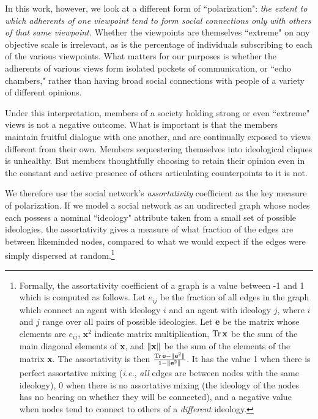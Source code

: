 In this work, however, we look at a different form of ``polarization":
\textit{the extent to which adherents of one viewpoint tend to form social
connections only with others of that same viewpoint.} Whether the viewpoints
are themselves ``extreme" on any objective scale is irrelevant, as is the
percentage of individuals subscribing to each of the various viewpoints. What
matters for our purposes is whether the adherents of various views form
isolated pockets of communication, or ``echo chambers," rather than having
broad social connections with people of a variety of different opinions.

Under this interpretation, members of a society holding strong or even
``extreme" views is not a negative outcome. What is important is that the
members maintain fruitful dialogue with one another, and are continually
exposed to views different from their own. Members sequestering themselves
into ideological cliques is unhealthy. But members thoughtfully choosing
to retain their opinion even in the constant and active presence of others
articulating counterpoints to it is not.

We therefore use the social network's \textit{assortativity}
coefficient\cite{newman_mixing_2003} as the key measure of polarization. If we
model a social network as an undirected graph whose nodes each possess a
nominal ``ideology" attribute taken from a small set of possible ideologies,
the assortativity gives a measure of what fraction of the edges are between
likeminded nodes, compared to what we would expect if the edges were simply
dispersed at random.\footnote{Formally, the assortativity coefficient of a
graph is a value between -1 and 1 which is computed as follows. Let $e_{ij}$
be the fraction of all edges in the graph which connect an agent with ideology
$i$ and an agent with ideology $j$, where $i$ and $j$ range over all pairs of
possible ideologies. Let \textbf{e} be the matrix whose elements are $e_{ij}$,
$\textbf{x}^2$ indicate matrix multiplication, $\operatorname{Tr} \textbf{x}$ be the sum of
the main diagonal elements of \textbf{x}, and $\lVert\textbf{x}\rVert$ be the sum
of the elements of the matrix \textbf{x}. The assortativity is then $\frac{\operatorname{Tr}
\textbf{e} - \lVert\textbf{e}^2\rVert}{1 - \lVert\textbf{e}^2\rVert}$. It has the value
1 when there is perfect assortative mixing (\textit{i.e.}, \textit{all} edges
are between nodes with the same ideology), 0 when there is no assortative
mixing (the ideology of the nodes has no bearing on whether they will be
connected), and a negative value when nodes tend to connect to others of a
\textit{different} ideology.}

